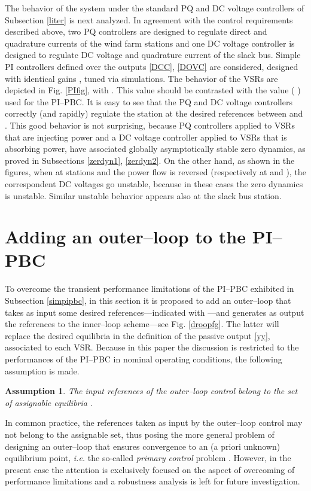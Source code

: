 \documentclass[5p,twocolumn]{elsarticle}
\def\lab{\label}
\newtheorem{assumption}[theorem]{Assumption}
\numberwithin{equation}{section}
\begin{document}
The behavior of the system under the standard PQ and DC voltage controllers of Subsection \ref{liter} is next analyzed. In agreement with the control requirements described above, two PQ controllers are designed to regulate direct and quadrature currents of the wind farm  stations  and one DC voltage controller is designed to regulate DC voltage and quadrature current of the slack bus. Simple PI controllers defined over the outputs \eqref{DCC}, \eqref{DOVC} are considered, designed with identical gains ,  tuned via simulations. The behavior of the VSRs are depicted in Fig. \ref{PIfig}, with  . This value should be contrasted with the value ( ) used for the PI--PBC. It is easy to see that the PQ and DC voltage controllers correctly (and rapidly) regulate the station at the desired references between  and  . This good behavior is not surprising, because PQ controllers applied to VSRs that are injecting power and a DC voltage controller applied to VSRs that is absorbing power, have associated globally asymptotically stable zero dynamics, as proved in Subsections \ref{zerdyn1}, \ref{zerdyn2}. On the other hand, as shown in the figures, when at stations  and  the power flow is reversed (respectively at   and  ), the correspondent DC voltages go unstable, because in these cases the zero dynamics is unstable. Similar unstable behavior appears also at the slack bus station.


\section{Adding an outer--loop to the PI--PBC}
\lab{sec6}
To overcome the transient performance limitations of the PI--PBC exhibited in Subsection \ref{simpipbc}, in this section it is proposed to add an outer--loop that takes as input some desired references---indicated with ---and generates as output the references to the inner--loop scheme---see Fig. \ref{droopfg}. The latter will replace the desired equilibria in the definition of the passive output \eqref{yy}, associated to each VSR. Because in this paper the discussion is restricted to the performances of the PI--PBC in nominal operating conditions, the following assumption is made.
\smallbreak

\begin{assumption}\label{assref} The input references  of the outer--loop control belong to the set of assignable equilibria .
\end{assumption}
\smallbreak

In common practice, the references taken as input by the outer--loop control may not belong to the assignable set, thus posing the more general problem of designing an outer--loop that ensures convergence to an (a priori unknown) equilibrium point, \textit{i.e.} the so-called \textit{primary control} problem \cite{berteen,dorfler,sandberg}. However, in the present case the attention is exclusively focused on the aspect of overcoming of performance limitations and  a robustness analysis is left for future investigation.
\end{document}
